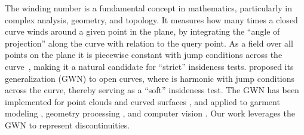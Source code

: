 The winding number is a fundamental concept in mathematics, particularly in complex analysis, geometry, and topology. It measures how many times a closed curve winds around a given point in the plane, by integrating the ``angle of projection'' along the curve with relation to the query point. As a field over all points on the plane it is piecewise constant with jump conditions across the curve~\cite{Reinhart1960TheWN, 10.1145/368637.368653}, making it a natural candidate for ``strict'' insideness tests. \citet{Jacobson:2018:GWN} proposed its generalization (GWN) to open curves, where  is harmonic with jump conditions across the curve, thereby serving as a  ``soft'' insideness test. The GWN has been implemented for point clouds \cite{Barill:FW:2018} and curved surfaces \cite{Feng:2023:WND}, and applied to garment modeling \cite{Hu:2018:TMW, chi2021garmentnets}, geometry processing \cite{Rui2023GCNO, Zhou:2016:MASG}, and computer vision \cite{Mueller:CVPR:2021}. 
Our work leverages the GWN to represent discontinuities. 




